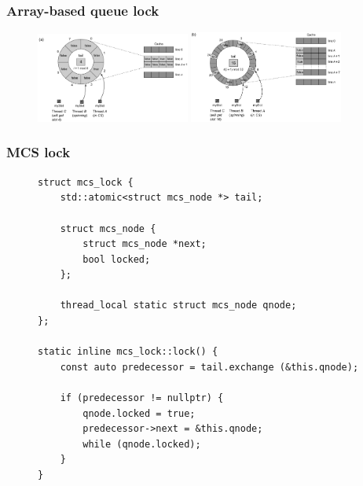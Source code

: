 \documentclass[aspectratio=169, pdf, 8pt, unicode]{beamer}
\begin{document}
\begin{frame}[fragile]
\frametitle{Array-based queue lock}
\begin{figure}[H]
\centering
\includegraphics[width=0.45\textwidth]{fig/alock_padding-a.png}
\includegraphics[width=0.45\textwidth]{fig/alock_padding-b.png}
\end{figure}
\end{frame}

\begin{frame}[fragile]
\frametitle{MCS lock}
\begin{figure}[H]
\begin{minipage}{0.8\textwidth}
\small
\begin{verbatim}
struct mcs_lock {
    std::atomic<struct mcs_node *> tail;

    struct mcs_node {
        struct mcs_node *next;
        bool locked;
    };

    thread_local static struct mcs_node qnode;
};

static inline mcs_lock::lock() {
    const auto predecessor = tail.exchange (&this.qnode);

    if (predecessor != nullptr) {
        qnode.locked = true;
        predecessor->next = &this.qnode;
        while (qnode.locked);
    }
}
\end{verbatim}
\end{minipage}
\end{figure}
\end{frame}
\end{document}
